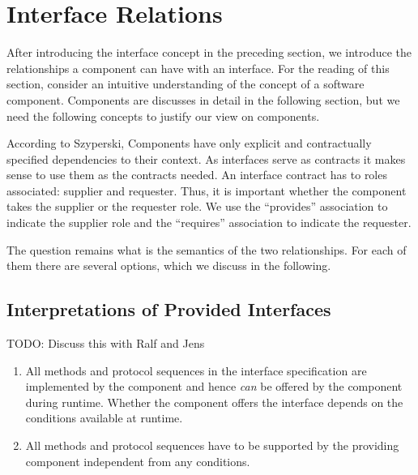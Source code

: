 %
%
%
%
%
%

\section{Interface Relations}

After introducing the interface concept in the preceding section, we introduce the relationships a component can have with an interface. For the reading of this section, consider an intuitive understanding of the concept of a software component. Components are discusses in detail in the following section, but we need the following concepts to justify our view on components.

According to Szyperski, Components have only explicit and contractually specified dependencies to their context. As interfaces serve as contracts it makes sense to use them as the contracts needed. An interface contract has to roles associated: supplier and requester. Thus, it is important whether the component takes the supplier or the requester role. We use the "`provides"' association to indicate the supplier role and the "`requires"' association to indicate the requester.

The question remains what is the semantics of the two relationships. For each of them there are several options, which we discuss in the following. 

\subsection{Interpretations of Provided Interfaces}
TODO: Discuss this with Ralf and Jens

\begin{enumerate}
\item All methods and protocol sequences in the interface specification are implemented by the component and hence \emph{can} be offered by the component during runtime. Whether the component offers the interface depends on the conditions available at runtime.
\item All methods and protocol sequences have to be supported by the providing component independent from any conditions. 
\end{enumerate}

